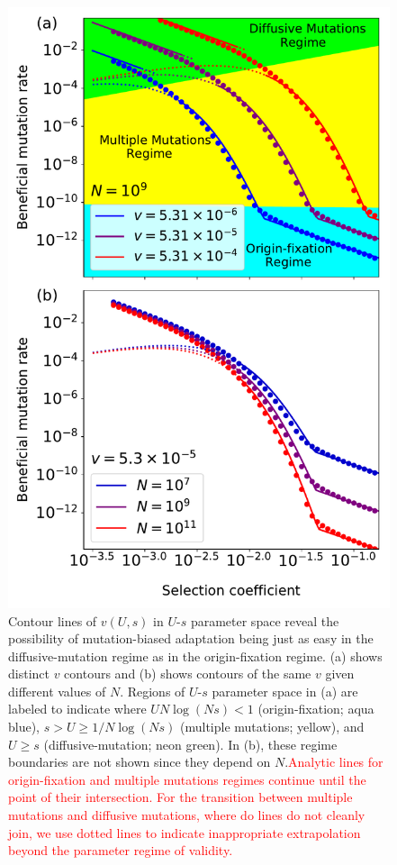 \documentclass[9pt,twocolumn,twoside]{article}
\begin{document}
\begin{figure}[!ht]
\centering
\includegraphics[scale=.44]{fig_v_contours2.pdf}
\caption{\label{fig:vContour} \small Contour lines of $v(U,s)$ in $U$-$s$ parameter space reveal the possibility of mutation-biased adaptation being just as easy in the diffusive-mutation regime as in the origin-fixation regime. (a) shows distinct $v$ contours and (b) shows contours of the same $v$ given different values of $N$. Regions of $U$-$s$ parameter space in (a) are labeled to indicate where $UN \log(Ns) < 1$ (origin-fixation; aqua blue), $s>U \geq 1/N \log(Ns)$ (multiple mutations; yellow), and $U\geq s$ (diffusive-mutation; neon green). In (b), these regime boundaries are not shown since they depend on $N$.\textcolor{red}{Analytic lines for origin-fixation and multiple mutations regimes continue until the point of their intersection. For the transition between multiple mutations and diffusive mutations, where do lines do not cleanly join, we use dotted lines to indicate inappropriate extrapolation beyond the parameter regime of validity.}}
\end{figure}
\end{document}
